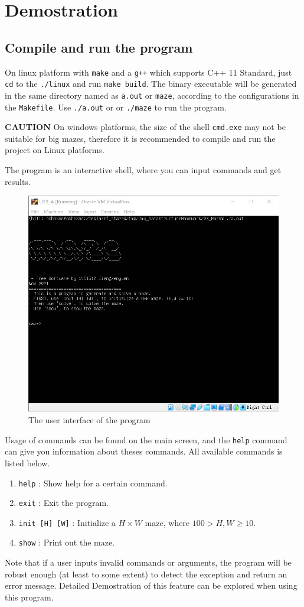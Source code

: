 \documentclass[cn,black,12pt,normal]{elegantnote}
\begin{document}
\section{Demostration}

\subsection{Compile and run the program}

On linux platform with \lstinline{make} and a \lstinline{g++} which supports C++ 11 Standard, just \lstinline{cd} to the \lstinline{./linux} and run \lstinline{make build}. The binary executable will be generated in the same directory named as \lstinline{a.out} or \lstinline{maze}, according to the configurations in the \lstinline{Makefile}. Use \lstinline{./a.out} or or \lstinline{./maze} to run the program.

\textbf{CAUTION} On windows platforms, the size of the shell \lstinline{cmd.exe} may not be suitable for big mazes, therefore it is recommended to compile and run the project on Linux platforms.

The program is an interactive shell, where you can input commands and get results.

\begin{figure}[H]
    \centering
    \includegraphics[width=0.7\linewidth]{image/m01.jpg}
    \caption{The user interface of the program}
\end{figure}

Usage of commands can be found on the main screen, and the \lstinline{help} command can give you information about theses commands.  All available commands is listed below.

\begin{enumerate}
    \item \lstinline{help} : Show help for a certain command.
    \item \lstinline{exit} : Exit the program.
    \item \lstinline{init [H] [W]} : Initialize a $H \times W$ maze, where $100 > H,W \geq 10$.
    \item \lstinline{show} : Print out the maze.
\end{enumerate}
Note that if a user inputs invalid commands or arguments, the program will be robust enough (at least to some extent) to detect the exception and return an error message. Detailed Demostration of this feature can be explored when using this program.
\end{document}

